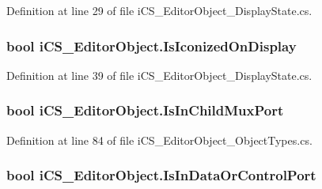 Definition at line 29 of file i\+C\+S\+\_\+\+Editor\+Object\+\_\+\+Display\+State.\+cs.

\hypertarget{classi_c_s___editor_object_a464b87c3edd71716bd62911cd3de443e}{
\subsubsection[{Is\+Iconized\+On\+Display}]{\setlength{\rightskip}{0pt plus 5cm}bool i\+C\+S\+\_\+\+Editor\+Object.\+Is\+Iconized\+On\+Display\hspace{0.3cm}{\ttfamily [get]}}}\label{classi_c_s___editor_object_a464b87c3edd71716bd62911cd3de443e}


Definition at line 39 of file i\+C\+S\+\_\+\+Editor\+Object\+\_\+\+Display\+State.\+cs.

\hypertarget{classi_c_s___editor_object_afe1b233c9268cd8d347357185dc533c4}{
\subsubsection[{Is\+In\+Child\+Mux\+Port}]{\setlength{\rightskip}{0pt plus 5cm}bool i\+C\+S\+\_\+\+Editor\+Object.\+Is\+In\+Child\+Mux\+Port\hspace{0.3cm}{\ttfamily [get]}}}\label{classi_c_s___editor_object_afe1b233c9268cd8d347357185dc533c4}


Definition at line 84 of file i\+C\+S\+\_\+\+Editor\+Object\+\_\+\+Object\+Types.\+cs.

\hypertarget{classi_c_s___editor_object_a2099c6826117fb68cec8593027dda4fa}{
\subsubsection[{Is\+In\+Data\+Or\+Control\+Port}]{\setlength{\rightskip}{0pt plus 5cm}bool i\+C\+S\+\_\+\+Editor\+Object.\+Is\+In\+Data\+Or\+Control\+Port\hspace{0.3cm}{\ttfamily [get]}}}\label{classi_c_s___editor_object_a2099c6826117fb68cec8593027dda4fa}


